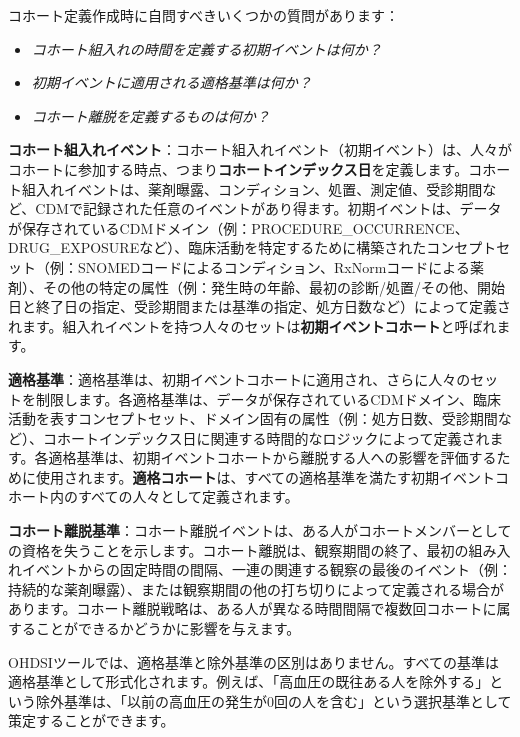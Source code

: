 \documentclass[
  11pt]{book}
\makeatletter
\providecommand{\tightlist}{%
  \setlength{\itemsep}{0pt}\setlength{\parskip}{0pt}}
\newenvironment{kframe}{%
\medskip{}
\setlength{\fboxsep}{.8em}
 \def\at@end@of@kframe{}%
 \ifinner\ifhmode%
  \def\at@end@of@kframe{\end{minipage}}%
  \begin{minipage}{\columnwidth}%
 \fi\fi%
 \def\FrameCommand##1{\hskip\@totalleftmargin \hskip-\fboxsep
 \colorbox{myShadeColor}{##1}\hskip-\fboxsep
     \hskip-\linewidth \hskip-\@totalleftmargin \hskip\columnwidth}%
 \MakeFramed {\advance\hsize-\width
   \@totalleftmargin\z@ \linewidth\hsize
   \@setminipage}}%
 {\par\unskip\endMakeFramed%
 \at@end@of@kframe}
\newenvironment{rmdblock}[1]
  {
  \begin{itemize}
  \renewcommand{\labelitemi}{
    \raisebox{-.7\height}[0pt][0pt]{
      {\setkeys{Gin}{width=3em,keepaspectratio}\texttt{[image: images/\#1]}}
    }
  }
  \setlength{\fboxsep}{1em}
  \begin{kframe}
  \item
  }
  {
  \end{kframe}
  \end{itemize}
  }
\newenvironment{rmdimportant}
  {\begin{rmdblock}{important}}
  {\end{rmdblock}}
\theoremstyle{definition}
\theoremstyle{definition}
\theoremstyle{definition}
\theoremstyle{definition}
\theoremstyle{remark}
\makeatother
\begin{document}
コホート定義作成時に自問すべきいくつかの質問があります：

\begin{itemize}
\tightlist
\item
  \emph{コホート組入れの時間を定義する初期イベントは何か？}
\item
  \emph{初期イベントに適用される適格基準は何か？}
\item
  \emph{コホート離脱を定義するものは何か？}
\end{itemize}

\textbf{コホート組入れイベント}：コホート組入れイベント（初期イベント）は、人々がコホートに参加する時点、つまり\textbf{コホートインデックス日}を定義します。コホート組入れイベントは、薬剤曝露、コンディション、処置、測定値、受診期間など、CDMで記録された任意のイベントがあり得ます。初期イベントは、データが保存されているCDMドメイン（例：PROCEDURE\_OCCURRENCE、DRUG\_EXPOSUREなど）、臨床活動を特定するために構築されたコンセプトセット（例：SNOMEDコードによるコンディション、RxNormコードによる薬剤）、その他の特定の属性（例：発生時の年齢、最初の診断/処置/その他、開始日と終了日の指定、受診期間または基準の指定、処方日数など）によって定義されます。組入れイベントを持つ人々のセットは\textbf{初期イベントコホート}と呼ばれます。

\textbf{適格基準}：適格基準は、初期イベントコホートに適用され、さらに人々のセットを制限します。各適格基準は、データが保存されているCDMドメイン、臨床活動を表すコンセプトセット、ドメイン固有の属性（例：処方日数、受診期間など）、コホートインデックス日に関連する時間的なロジックによって定義されます。各適格基準は、初期イベントコホートから離脱する人への影響を評価するために使用されます。\textbf{適格コホート}は、すべての適格基準を満たす初期イベントコホート内のすべての人々として定義されます。

\textbf{コホート離脱基準}：コホート離脱イベントは、ある人がコホートメンバーとしての資格を失うことを示します。コホート離脱は、観察期間の終了、最初の組み入れイベントからの固定時間の間隔、一連の関連する観察の最後のイベント（例：持続的な薬剤曝露）、または観察期間の他の打ち切りによって定義される場合があります。コホート離脱戦略は、ある人が異なる時間間隔で複数回コホートに属することができるかどうかに影響を与えます。 

\begin{rmdimportant}
OHDSIツールでは、適格基準と除外基準の区別はありません。すべての基準は適格基準として形式化されます。例えば、「高血圧の既往ある人を除外する」という除外基準は、「以前の高血圧の発生が0回の人を含む」という選択基準として策定することができます。
\end{rmdimportant}
\end{document}
